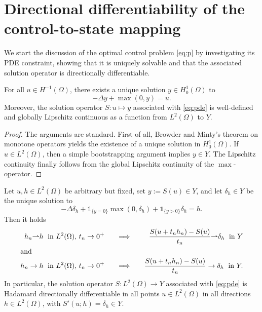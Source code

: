 \documentclass[reqno]{shinyart}
\begin{document}
\section{Directional differentiability of the control-to-state mapping}
We start the discussion of the optimal control problem \eqref{eq:p} by investigating its PDE constraint, 
showing that it is uniquely solvable and that the associated solution operator is directionally differentiable.

\begin{proposition}\label{prop:basic}
    For all $u\in H^{-1}(\Omega)$, there exists a unique solution $y \in H^1_0(\Omega)$ to 
    \begin{equation}\tag{PDE}\label{eq:pde}
        -\Delta y + \max(0, y) = u.
    \end{equation}
    Moreover, the solution operator $S: u \mapsto y$ associated with \eqref{eq:pde} 
    is well-defined and globally Lipschitz continuous as a function from $L^2(\Omega)$ to $Y$.
\end{proposition}

\begin{proof}
    The arguments are standard. First of all, Browder and Minty's theorem on monotone 
    operators yields the existence of a unique solution in $H^1_0(\Omega)$. 
    If $u\in L^2(\Omega)$, then a simple bootstrapping argument implies $y \in Y$. 
    The Lipschitz continuity finally follows from the global Lipschitz continuity of the $\max$-operator.
\end{proof}

\begin{theorem}\label{thm:rabl}
    Let $u, h \in L^2(\Omega)$ be arbitrary but fixed, set $y:=S(u)\in Y$, 
    and let $\delta_h \in Y$ be the unique solution to 
    \begin{equation}\label{eq:ddpde}
        - \Delta \delta_h +  \mathbb{1}_{\{y = 0\}}\max(0, \delta_h) + \mathbb{1}_{\{y >0\}} \delta_h = h.
    \end{equation}
    Then it holds
    \begin{alignat*}{3} 
        h_n  {\rightharpoonup} h \;\text{ in }L^2(\Omega),\,t_n \to 0^+ & \quad &
        \Longrightarrow & \quad & \frac{S(u + t_n h_n ) - S(u)}{t_n} {\rightharpoonup} \delta_h \;\text{ in }Y\\
        \intertext{and} 
        h_n  \to h \;\text{ in }L^2(\Omega),\, t_n \to 0^+ & \quad & 
        \Longrightarrow & \quad & \frac{S(u + t_n h_n ) - S(u)}{t_n} \to \delta_h \;\text{ in }Y.
    \end{alignat*}
    In particular, the solution operator $S : L^2(\Omega) \to Y$ associated with 
    \eqref{eq:pde} is Hadamard directionally differentiable in all points $u \in L^2(\Omega)$ 
    in all directions $h \in L^2(\Omega)$, with $S'(u; h) = \delta_h \in Y$.
\end{theorem}
\end{document}
